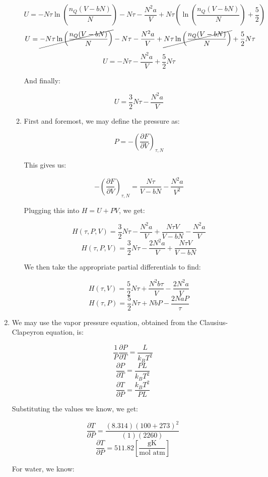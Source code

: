 \begin{enumerate}
\begin{enumerate}
        $$U=-N\tau\ln\left( \frac{n_Q(V-bN)}{N} \right)-N\tau-\frac{N^2a}{V}+N\tau\left( \ln\left( \frac{n_Q(V-bN)}{N} \right)+\frac{5}{2} \right)$$
        $$U=\cancel{-N\tau\ln\left( \frac{n_Q(V-bN)}{N} \right)}-N\tau-\frac{N^2a}{V}+\cancel{N\tau\ln\left( \frac{n_Q(V-bN)}{N} \right)}+\frac{5}{2}N\tau$$
        $$U=-N\tau-\frac{N^2a}{V}+\frac{5}{2}N\tau$$

        And finally:

        $$\boxed{U=\frac{3}{2}N\tau-\frac{N^2a}{V}}$$

      \item 

        First and foremost, we may define the pressure as:

        $$P=-\left( \frac{\partial F}{\partial V} \right)_{\tau,N}$$

        This gives us:

        $$-\left( \frac{\partial F}{\partial V} \right)_{\tau,N}=\frac{N\tau}{V-bN}-\frac{N^2a}{V^2}$$

        Plugging this into $H=U+PV$, we get:

        $$H(\tau, P, V)=\frac{3}{2}N\tau-\frac{N^2a}{V}+\frac{N\tau V}{V-bN}-\frac{N^2a}{V}$$
        $$H(\tau, P, V)=\frac{3}{2}N\tau-\frac{2N^2a}{V}+\frac{N\tau V}{V-bN}$$

        We then take the appropriate partial differentials to find:

        $$\boxed{H(\tau, V)=\frac{5}{2}N\tau+\frac{N^2b\tau}{V}-\frac{2N^2a}{V}}$$
        $$\boxed{H(\tau, P)=\frac{5}{2}N\tau+NbP-\frac{2NaP}{\tau}}$$

    \end{enumerate}

  \item

    We may use the vapor pressure equation, obtained from the Clausius-Clapeyron equation, is:

    $$\frac{1}{P}\frac{\partial P}{\partial T}=\frac{L}{k_BT^2}$$
    $$\frac{\partial P}{\partial T}=\frac{PL}{k_BT^2}$$
    $$\frac{\partial T}{\partial P}=\frac{k_BT^2}{PL}$$

    Substituting the values we know, we get:

    $$\frac{\partial T}{\partial P}=\frac{\left( 8.314 \right)\left( 100 + 273 \right)^2}{(1)(2260)}$$
    $$\frac{\partial T}{\partial P}=511.82\left[ \frac{\si{\gram\kelvin}}{\text{mol atm}} \right]$$

    For water, we know:


\end{enumerate}
